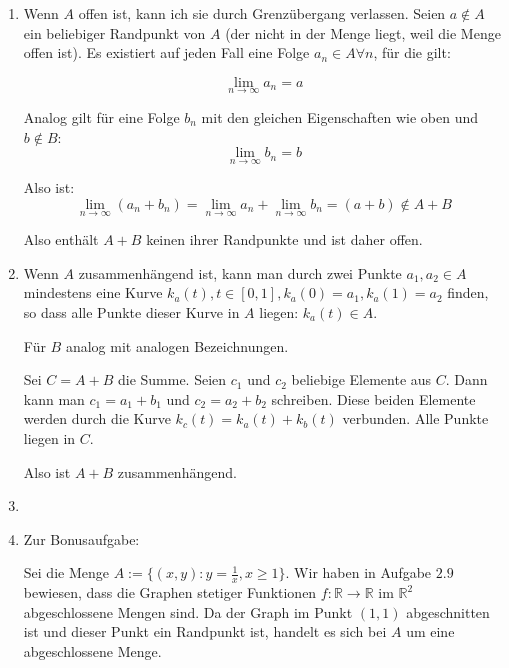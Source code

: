 \documentclass[a4paper,german,12pt,smallheadings]{scrartcl}
\begin{document}
\begin{enumerate}[(1)]
  \item
    Wenn $A$ offen ist, kann ich sie durch Grenzübergang verlassen. Seien $a
    \notin A$ ein beliebiger Randpunkt von $A$ (der nicht in der Menge liegt,
    weil die Menge offen ist). Es existiert auf jeden Fall eine Folge $a_n \in
    A \forall n$, für die gilt:

    \begin{equation*}
      \lim_{n \to \infty} a_n = a
    \end{equation*}

    Analog gilt für eine Folge $b_n$ mit den gleichen Eigenschaften wie oben
    und $b \notin B$:
    \begin{equation*}
      \lim_{n \to \infty} b_n = b
    \end{equation*}

    Also ist:
    \begin{equation*}
      \lim_{n \to \infty} (a_n + b_n) = \lim_{n \to \infty} a_n + \lim_{n \to \infty} b_n = (a + b) \notin A + B
    \end{equation*}

    Also enthält $A+B$ keinen ihrer Randpunkte und ist daher offen.

  \item
    Wenn $A$ zusammenhängend ist, kann man durch zwei Punkte $a_1, a_2 \in A$
    mindestens eine Kurve $k_a(t), t \in [0,1], k_a(0) = a_1, k_a(1) = a_2$
    finden, so dass alle Punkte dieser Kurve in $A$ liegen: $k_a(t) \in A$.

    Für $B$ analog mit analogen Bezeichnungen.

    Sei $C = A+B$ die Summe. Seien $c_1$ und $c_2$ beliebige Elemente aus $C$.
    Dann kann man $c_1 = a_1 + b_1$ und $c_2 = a_2 + b_2$ schreiben. Diese
    beiden Elemente werden durch die Kurve $k_c(t) = k_a(t) + k_b(t)$
    verbunden. Alle Punkte liegen in $C$.

    Also ist $A+B$ zusammenhängend.
  \item

  \item
    Zur Bonusaufgabe:

    Sei die Menge $A := \{(x,y): y = \frac{1}{x}, x \ge 1\}$. Wir
    haben in Aufgabe $2.9$ bewiesen, dass die Graphen stetiger Funktionen $f:
    \mathbb{R} \to \mathbb{R}$ im $\mathbb{R}^2$ abgeschlossene Mengen sind. Da der
    Graph im Punkt $(1,1)$ abgeschnitten ist und dieser Punkt ein Randpunkt ist,
    handelt es sich bei $A$ um eine abgeschlossene Menge.


\end{enumerate}
\end{document}
